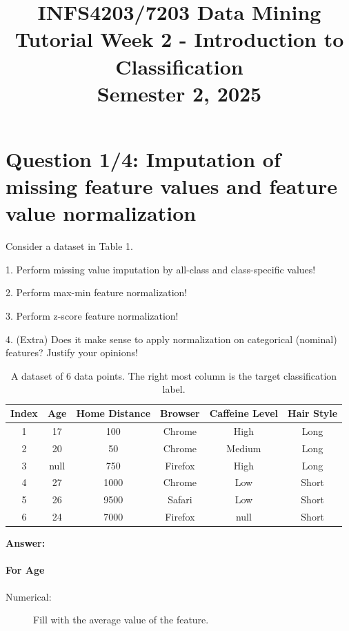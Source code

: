 \documentclass[12pt,a4paper]{article}
\title{INFS4203/7203 Data Mining \\ Tutorial Week 2 - Introduction to Classification \\ Semester 2, 2025}
\date{}
\begin{document}
\maketitle

\section*{Question 1/4: Imputation of missing feature values and feature value normalization}

Consider a dataset in Table 1.

1. Perform missing value imputation by all-class and class-specific values!

2. Perform max-min feature normalization!

3. Perform z-score feature normalization!

4. (Extra) Does it make sense to apply normalization on categorical (nominal) features?
Justify your opinions!

\begin{table}[H]
  \centering
  \caption{A dataset of 6 data points. The right most column is the target classification label.}
  \begin{tabular}{c c c c c c}
    \toprule
    Index & Age  & Home Distance & Browser & Caffeine Level & Hair Style \\
    \midrule
    1     & 17   & 100           & Chrome  & High           & Long       \\
    2     & 20   & 50            & Chrome  & Medium         & Long       \\
    3     & null & 750           & Firefox & High           & Long       \\
    4     & 27   & 1000          & Chrome  & Low            & Short      \\
    5     & 26   & 9500          & Safari  & Low            & Short      \\
    6     & 24   & 7000          & Firefox & null           & Short      \\
    \bottomrule
  \end{tabular}
\end{table}

\textbf{Answer:}

\paragraph{For Age}
\begin{description}
  \item[Numerical:] Fill with the average value of the feature.
\end{description}
\end{document}
